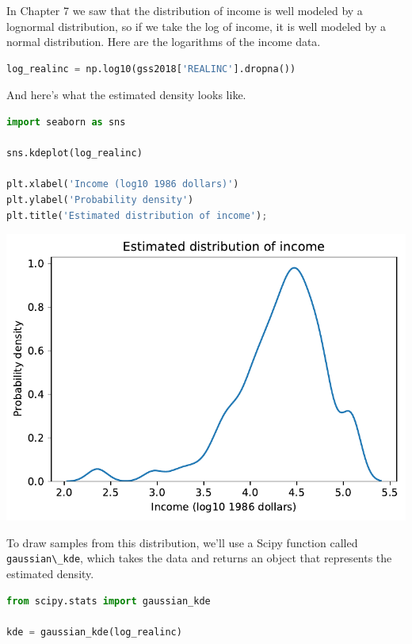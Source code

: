 In Chapter 7 we saw that the distribution of income is well modeled by a
lognormal distribution, so if we take the log of income, it is well
modeled by a normal distribution. Here are the logarithms of the income
data.

\begin{lstlisting}[language=Python,style=source]
log_realinc = np.log10(gss2018['REALINC'].dropna())
\end{lstlisting}

And here's what the estimated density looks like.

\begin{lstlisting}[language=Python,style=source]
import seaborn as sns

sns.kdeplot(log_realinc)

plt.xlabel('Income (log10 1986 dollars)')
plt.ylabel('Probability density')
plt.title('Estimated distribution of income');
\end{lstlisting}

\begin{center}
\includegraphics[scale=0.75]{12_bootstrap_files/12_bootstrap_115_0.pdf}
\end{center}

To draw samples from this distribution, we'll use a Scipy function
called \passthrough{\lstinline!gaussian\_kde!}, which takes the data and
returns an object that represents the estimated density.

\begin{lstlisting}[language=Python,style=source]
from scipy.stats import gaussian_kde

kde = gaussian_kde(log_realinc)
\end{lstlisting}

